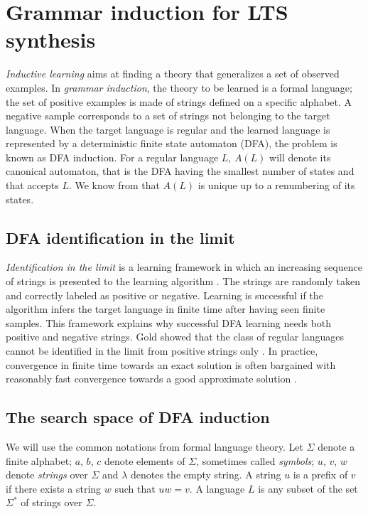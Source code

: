 \section{Grammar induction for LTS synthesis\label{section:inductive-background}}

\emph{Inductive learning} aims at finding a theory that generalizes a set of observed examples. In \emph{grammar induction}, the theory to be learned is a formal language; the set of positive examples is made of strings defined on a specific alphabet. A negative sample corresponds to a set of strings not belonging to the target language. When the target language is regular and the learned language is represented by a deterministic finite state automaton (DFA), the problem is known as DFA induction. For a regular language $L$, $A(L)$ will denote its canonical automaton, that is the DFA having the smallest number of states and that accepts $L$. We know from \cite{Hopcroft:1979} that $A(L)$ is unique up to a renumbering of its states.

\subsection{DFA identification in the limit\label{subsection:dfa-identification-in-the-limit}}

\emph{Identification in the limit} is a learning framework in which an increasing sequence of strings is presented to the learning algorithm \cite{Gold:1967}. The strings are randomly taken and correctly labeled as positive or negative. Learning is successful if the algorithm infers the target language in finite time after having seen finite samples. This framework explains why successful DFA learning needs both positive and negative strings. Gold showed that the class of regular languages cannot be identified in the limit from positive strings only \cite{Gold:1967}. In practice, convergence in finite time towards an exact solution is often bargained with reasonably fast convergence towards a good approximate solution \cite{Lang:1992}.

\subsection{The search space of DFA induction\label{subsection:gi-background-search-space}}

We will use the common notations from formal language theory. Let $\Sigma$ denote a finite alphabet; $a$, $b$, $c$ denote elements of $\Sigma$, sometimes called \emph{symbols}; $u$, $v$, $w$ denote \emph{strings} over $\Sigma$ and $\lambda$ denotes the empty string. A string $u$ is a prefix of $v$ if there exists a string $w$ such that $uw = v$. A language $L$ is any subset of the set $\Sigma^*$ of strings over $\Sigma$. 

